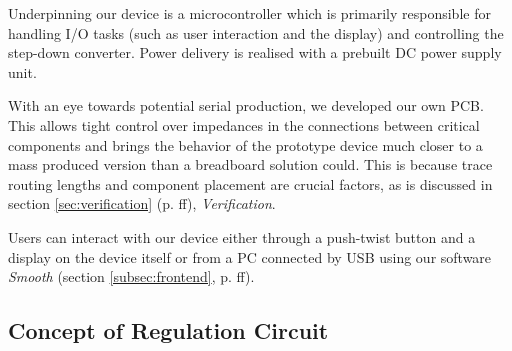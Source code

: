 
Underpinning our device  is a microcontroller which is primarily responsible for
handling I/O tasks (such  as  user  interaction and the display) and controlling
the step-down converter. Power  delivery  is  realised  with a prebuilt DC power
supply unit.

With an eye towards  potential serial production, we developed our own PCB. This
allows  tight  control  over impedances  in  the  connections  between  critical
components and brings the behavior of the prototype device much closer to a mass
produced version than a breadboard solution could. This is because trace routing
lengths and component placement are  crucial factors, as is discussed in section
\ref{sec:verification}  (p.  \pageref{sec:verification}ff), \emph{Verification}.

Users can  interact with our device  either through a push-twist  button and a
display on the device itself or from  a PC connected by USB using our software
\emph{Smooth} (section \ref{subsec:frontend}, p. \pageref{subsec:frontend}ff).


\subsection{Concept of Regulation Circuit}

